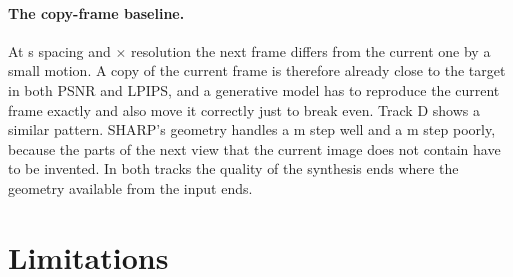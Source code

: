 \documentclass[10pt]{article}
\begin{document}
\paragraph{The copy-frame baseline.}
At \NFdtMedian{} s spacing and \NFw$\times$\NFh{} resolution the next frame differs from the current one
by a small motion. A copy of the current frame is therefore already close to the target in both PSNR and
LPIPS, and a generative model has to reproduce the current frame exactly and also move it correctly just to
break even. Track D shows a similar pattern. SHARP's geometry handles a \SharpSweepmotion{} m step well and
a \SharpKeymotion{} m step poorly, because the parts of the next view that the current image does not
contain have to be invented. In both tracks the quality of the synthesis ends where the geometry available
from the input ends.

\section{Limitations}
\label{sec:limits}
\end{document}
